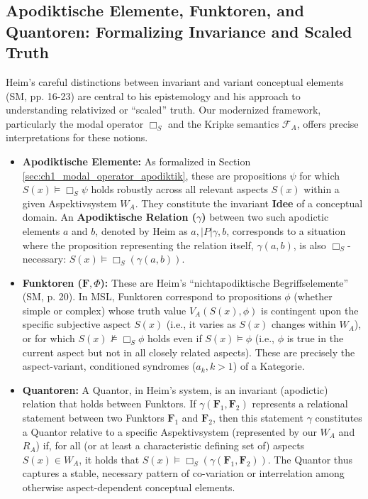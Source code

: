\documentclass[
    12pt,              %
    a4paper,           %
    headings=normal,   %
    twoside=true,      %
    BCOR=8mm,          %
]{scrbook}
\newcommand{\q}[1]{\enquote{#1}}
\newcommand{\conceptualsyndrome}{a}
\newcommand{\aspektivsystem}{P}
\newcommand{\funktor}{\bm{F}}
\newcommand{\BoxS}{\Box_S}
\begin{document}
\subsection{Apodiktische Elemente, Funktoren, and Quantoren: Formalizing Invariance and Scaled Truth}
\label{sec:ch1_revisit_apodiktik_funktoren_quantoren} 

Heim’s careful distinctions between invariant and variant conceptual elements (SM, pp. 16-23) are central to his epistemology and his approach to understanding relativized or \q{scaled} truth. Our modernized framework, particularly the modal operator \(\BoxS\) and the Kripke semantics \(\mathcal{F}_A\), offers precise interpretations for these notions.

\begin{itemize}
    \item   \textbf{Apodiktische Elemente:} As formalized in Section \ref{sec:ch1_modal_operator_apodiktik}, these are propositions \(\psi\) for which \(S(x) \vDash \BoxS \psi\) holds robustly across all relevant aspects \(S(x)\) within a given Aspektivsystem \(W_A\). They constitute the invariant \textbf{Idee} of a conceptual domain. An \textbf{Apodiktische Relation (\(\gamma\))} between two such apodictic elements \(a\) and \(b\), denoted by Heim as \(a, |\aspektivsystem| \gamma, b\), corresponds to a situation where the proposition representing the relation itself, \(\gamma(a,b)\), is also \(\BoxS\)-necessary: \(S(x) \vDash \BoxS (\gamma(a,b))\).

    \item   \textbf{Funktoren (\(\funktor, \Phi\)):} These are Heim’s \q{nichtapodiktische Begriffselemente} (SM, p. 20). In MSL, Funktoren correspond to propositions \(\phi\) (whether simple or complex) whose truth value \(V_A(S(x), \phi)\) is contingent upon the specific subjective aspect \(S(x)\) (i.e., it varies as \(S(x)\) changes within \(W_A\)), or for which \(S(x) \nvDash \BoxS \phi\) holds even if \(S(x) \vDash \phi\) (i.e., \(\phi\) is true in the current aspect but not in all closely related aspects). These are precisely the aspect-variant, conditioned syndromes (\(\conceptualsyndrome_k, k>1\)) of a Kategorie.

    \item   \textbf{Quantoren:} A Quantor, in Heim's system, is an invariant (apodictic) relation that holds between Funktors. If \(\gamma(\funktor_1, \funktor_2)\) represents a relational statement between two Funktors \(\funktor_1\) and \(\funktor_2\), then this statement \(\gamma\) constitutes a Quantor relative to a specific Aspektivsystem (represented by our \(W_A\) and \(R_A\)) if, for all (or at least a characteristic defining set of) aspects \(S(x) \in W_A\), it holds that \(S(x) \vDash \BoxS (\gamma(\funktor_1, \funktor_2))\). The Quantor thus captures a stable, necessary pattern of co-variation or interrelation among otherwise aspect-dependent conceptual elements.


\end{itemize}
\end{document}
